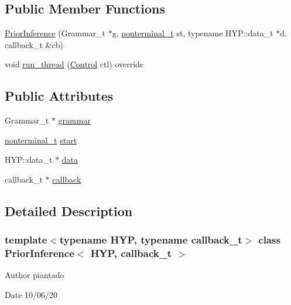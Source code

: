 \subsection*{Public Member Functions}
\begin{DoxyCompactItemize}
\item 
\hyperlink{class_prior_inference_ad6ccd45888ca5616f03daed5dd0a1139}{Prior\+Inference} (Grammar\+\_\+t $\ast$g, \hyperlink{_nonterminal_8h_a1c5bfe9b903f69c83bbde5da7035fef3}{nonterminal\+\_\+t} st, typename H\+Y\+P\+::data\+\_\+t $\ast$d, callback\+\_\+t \&cb)
\item 
void \hyperlink{class_prior_inference_a1c641618dffc7d3182ffdb2451500c01}{run\+\_\+thread} (\hyperlink{struct_control}{Control} ctl) override
\end{DoxyCompactItemize}
\subsection*{Public Attributes}
\begin{DoxyCompactItemize}
\item 
Grammar\+\_\+t $\ast$ \hyperlink{class_prior_inference_abafbe828a4c4a98d3828c65e9826fab6}{grammar}
\item 
\hyperlink{_nonterminal_8h_a1c5bfe9b903f69c83bbde5da7035fef3}{nonterminal\+\_\+t} \hyperlink{class_prior_inference_ab5732461e8c514eebc2c29b3d19e4cd1}{start}
\item 
H\+Y\+P\+::data\+\_\+t $\ast$ \hyperlink{class_prior_inference_a537a489d953992aca5327899548df8ac}{data}
\item 
callback\+\_\+t $\ast$ \hyperlink{class_prior_inference_a0b71e0bf3b2c27fa97be006a3c3738a0}{callback}
\end{DoxyCompactItemize}


\subsection{Detailed Description}
\subsubsection*{template$<$typename H\+YP, typename callback\+\_\+t$>$\newline
class Prior\+Inference$<$ H\+Y\+P, callback\+\_\+t $>$}

\begin{DoxyAuthor}{Author}
piantado 
\end{DoxyAuthor}
\begin{DoxyDate}{Date}
10/06/20 
\end{DoxyDate}


